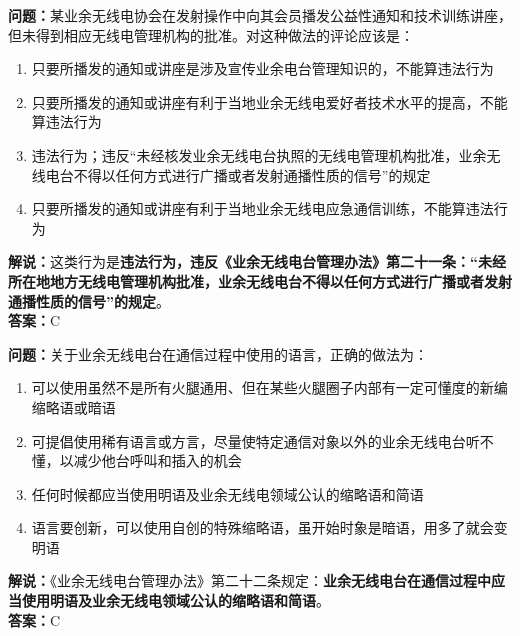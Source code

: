 \documentclass{ctexbook}
\begin{document}
\bigskip


\noindent\textbf{问题：}某业余无线电协会在发射操作中向其会员播发公益性通知和技术训练讲座，但未得到相应无线电管理机构的批准。对这种做法的评论应该是：
\begin{enumerate}[label=\Alph*), leftmargin=3em]
	\item 只要所播发的通知或讲座是涉及宣传业余电台管理知识的，不能算违法行为
	\item 只要所播发的通知或讲座有利于当地业余无线电爱好者技术水平的提高，不能算违法行为
	\item 违法行为；违反“未经核发业余无线电台执照的无线电管理机构批准，业余无线电台不得以任何方式进行广播或者发射通播性质的信号”的规定
	\item 只要所播发的通知或讲座有利于当地业余无线电应急通信训练，不能算违法行为
\end{enumerate}
\noindent\textbf{解说：}这类行为是\textbf{违法行为，违反《业余无线电台管理办法》第二十一条：“未经所在地地方无线电管理机构批准，业余无线电台不得以任何方式进行广播或者发射通播性质的信号”的规定}。\\\noindent\textbf{答案：}C



\bigskip


\noindent\textbf{问题：}关于业余无线电台在通信过程中使用的语言，正确的做法为：
\begin{enumerate}[label=\Alph*), leftmargin=3em]
	\item 可以使用虽然不是所有火腿通用、但在某些火腿圈子内部有一定可懂度的新编缩略语或暗语
	\item 可提倡使用稀有语言或方言，尽量使特定通信对象以外的业余无线电台听不懂，以减少他台呼叫和插入的机会
	\item 任何时候都应当使用明语及业余无线电领域公认的缩略语和简语
	\item 语言要创新，可以使用自创的特殊缩略语，虽开始时象是暗语，用多了就会变明语
\end{enumerate}
\noindent\textbf{解说：}《业余无线电台管理办法》第二十二条规定：\textbf{业余无线电台在通信过程中应当使用明语及业余无线电领域公认的缩略语和简语}。\\\noindent\textbf{答案：}C



\bigskip
\end{document}
